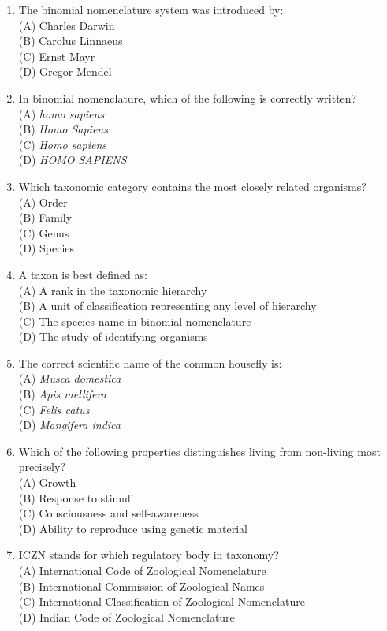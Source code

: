 \documentclass{article}
\begin{document}
\begin{enumerate}[label=Q\arabic*.]
\item The binomial nomenclature system was introduced by:
\\(A) Charles Darwin
\\(B) Carolus Linnaeus
\\(C) Ernst Mayr
\\(D) Gregor Mendel

\item In binomial nomenclature, which of the following is correctly written?
\\(A) \textit{homo sapiens}
\\(B) \textit{Homo Sapiens}
\\(C) \textit{Homo sapiens}
\\(D) \textit{HOMO SAPIENS}

\item Which taxonomic category contains the most closely related organisms?
\\(A) Order
\\(B) Family
\\(C) Genus
\\(D) Species

\item A taxon is best defined as:
\\(A) A rank in the taxonomic hierarchy
\\(B) A unit of classification representing any level of hierarchy
\\(C) The species name in binomial nomenclature
\\(D) The study of identifying organisms

\item The correct scientific name of the common housefly is:
\\(A) \textit{Musca domestica}
\\(B) \textit{Apis mellifera}
\\(C) \textit{Felis catus}
\\(D) \textit{Mangifera indica}

\item Which of the following properties distinguishes living from non-living most precisely?
\\(A) Growth
\\(B) Response to stimuli
\\(C) Consciousness and self-awareness
\\(D) Ability to reproduce using genetic material

\item ICZN stands for which regulatory body in taxonomy?
\\(A) International Code of Zoological Nomenclature
\\(B) International Commission of Zoological Names
\\(C) International Classification of Zoological Nomenclature
\\(D) Indian Code of Zoological Nomenclature


\end{enumerate}
\end{document}
